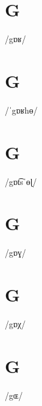 \documentclass[10pt,a4paper,twoside]{book}
\begin{document}
\section*{G}

\begin{multicols}{3}
 {/gɒʁ/} {}
\end{multicols}

\section*{G}

\begin{multicols}{3}
 {/ˈgɒʁhɵ/} {}
\end{multicols}

\section*{G}

\begin{multicols}{3}
 {/gɒt͡sˈɵɭ/} {}
\end{multicols}

\section*{G}

\begin{multicols}{3}
 {/gɒɣ/} {}
\end{multicols}

\section*{G}

\begin{multicols}{3}
 {/gɒχ/} {}
\end{multicols}

\section*{G}

\begin{multicols}{3}
 {/gɶ/} {}
\end{multicols}
\end{document}
